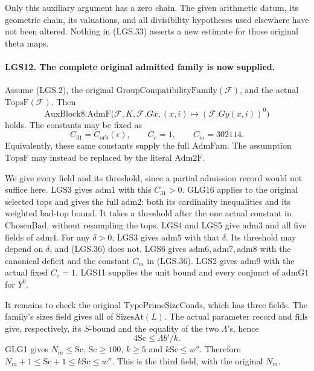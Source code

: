 Only this auxiliary argument has a zero chain.
The given arithmetic datum, its geometric chain,
its valuations, and all divisibility hypotheses used
elsewhere have not been altered.  Nothing in
(LGS.33) asserts a new estimate for those original
theta maps.

\paragraph{LGS12. The complete original admitted family is now supplied.}
\label{claim:LGS12}
Assume (LGS.2), the original
\(\mathrm{GroupCompatibilityFamily}(\mathcal F)\), and
the actual \(\mathrm{TopsF}(\mathcal F)\).
Then
\[
 \mathrm{AuxBlock8.AdmF}
   \bigl(\mathcal F,K,\mathcal F.Gx,
                     (x,i)\mapsto(\mathcal F.Gy(x,i))^0\bigr)      \tag{LGS.35}
\]
holds.  The constants may be fixed as
\[
       C_{31}=C_{\mathrm{orb}}(\epsilon),\qquad
                         C_e=1,\qquad C_m=302114.     \tag{LGS.36}
\]
Equivalently, these same constants supply the full
\(\mathrm{AdmFam}\).  The assumption \(\mathrm{TopsF}\)
may instead be replaced by the literal \(\mathrm{Adm2F}\).

We give every field and its threshold, since a partial
admission record would not suffice here.
LGS3 gives \(\mathrm{adm1}\) with this \(C_{31}>0\).
GLG16 applies to the original selected tops and gives
the full \(\mathrm{adm2}\): both its cardinality
inequalities and its weighted bad-top bound.
It takes a threshold after the one actual constant
in \(\mathrm{ChosenBad}\), without resampling the tops.
LGS4 and LGS5 give \(\mathrm{adm3}\) and all five
fields of \(\mathrm{adm4}\).
For any \(\delta>0\), LGS3 gives \(\mathrm{adm5}\)
with that \(\delta\).  Its threshold may depend on
\(\delta\), and (LGS.36) does not.
LGS6 gives \(\mathrm{adm6},\mathrm{adm7},\mathrm{adm8}\)
with the canonical deficit and the constant \(C_m\)
in (LGS.36).  LGS2 gives \(\mathrm{adm9}\) with
the actual fixed \(C_e=1\).
LGS11 supplies the unit bound and every conjunct of
\(\mathrm{admG1}\) for \(Y^0\).

It remains to check the original
\(\mathrm{TypePrimeSizeConds}\), which has three fields.
The family's \(\mathrm{sizes}\) field gives all of
\(\mathrm{SizesAt}(L)\).
The actual parameter record and \(\mathrm{fills}\)
give, respectively, its \(S\)-bound and the equality
of the two \(\Lambda\)'s, hence
\[
                  4\mathrm{Sc}\le\Lambda b'/k.
 \]
GLG1 gives \(N_m\le\mathrm{Sc}\),
\(\mathrm{Sc}\ge100\), \(k\ge5\) and
\(k\mathrm{Sc}\le w''\).  Therefore
\(N_m+1\le\mathrm{Sc}+1\le k\mathrm{Sc}\le w''\).
This is the third field, with the original \(N_m\).

